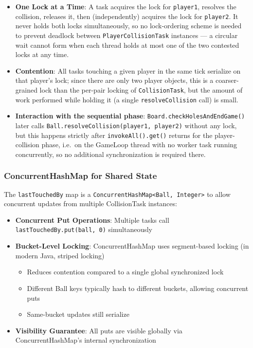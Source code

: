 \documentclass[12pt,a4paper]{article}
\begin{document}
\begin{itemize}
    \item \textbf{One Lock at a Time}: A task acquires the lock for \texttt{player1}, resolves the collision, releases it, then (independently) acquires the lock for \texttt{player2}. It never holds both locks simultaneously, so no lock-ordering scheme is needed to prevent deadlock between \texttt{PlayerCollisionTask} instances --- a circular wait cannot form when each thread holds at most one of the two contested locks at any time.
    \item \textbf{Contention}: All tasks touching a given player in the same tick serialize on that player's lock; since there are only two player objects, this is a coarser-grained lock than the per-pair locking of \texttt{CollisionTask}, but the amount of work performed while holding it (a single \texttt{resolveCollision} call) is small.
    \item \textbf{Interaction with the sequential phase}: \texttt{Board.checkHolesAndEndGame()} later calls \texttt{Ball.resolveCollision(player1, player2)} without any lock, but this happens strictly after \texttt{invokeAll().get()} returns for the player-collision phase, i.e.\ on the GameLoop thread with no worker task running concurrently, so no additional synchronization is required there.
\end{itemize}

\subsubsection{ConcurrentHashMap for Shared State}
 
The \texttt{lastTouchedBy} map is a \texttt{ConcurrentHashMap<Ball, Integer>} to allow concurrent updates from multiple CollisionTask instances:
 
\begin{itemize}
    \item \textbf{Concurrent Put Operations}: Multiple tasks call \texttt{lastTouchedBy.put(ball, 0)} simultaneously
    \item \textbf{Bucket-Level Locking}: ConcurrentHashMap uses segment-based locking (in modern Java, striped locking)
    \begin{itemize}
        \item Reduces contention compared to a single global synchronized lock
        \item Different Ball keys typically hash to different buckets, allowing concurrent puts
        \item Same-bucket updates still serialize
    \end{itemize}
    \item \textbf{Visibility Guarantee}: All puts are visible globally via ConcurrentHashMap's internal synchronization
\end{itemize}
 
\end{document}
